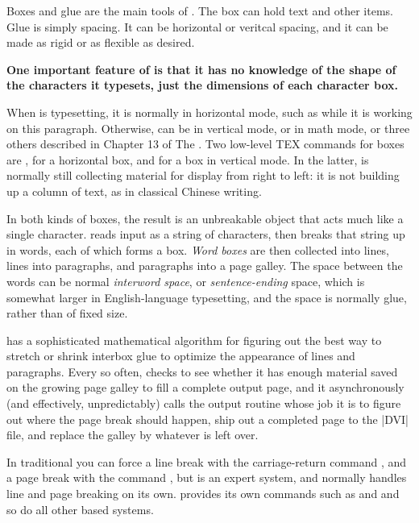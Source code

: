 Boxes and glue are the main tools of \tex. The box can hold text and other items. Glue is simply spacing. It can be horizontal or veritcal spacing, and it can be made as rigid or as flexible as desired.



\begin{minipage}{\linewidth}
\textbf{One important feature of \tex is that it has no knowledge of the shape of the characters it typesets, just the dimensions of each character box.}
\end{minipage}
\medskip

When \tex is typesetting, it is normally in horizontal mode, such as while
it is working on this paragraph. Otherwise, \tex can be in vertical mode, or
in math mode, or three others described in Chapter 13 of The \texbook.
Two low-level TEX commands for boxes are , for a horizontal box,
and  for a box in vertical mode. In the latter, \tex is normally still
collecting material for display from right to left: it is not building up a
column of text, as in classical Chinese writing.

In both kinds of boxes, the result is an unbreakable object that acts
much like a single character. \tex reads input as a string of characters,
then breaks that string up in words, each of which forms a box. 
\emph{Word boxes}
are then collected into lines, lines into paragraphs, and paragraphs into a
page galley. The space between the words can be normal \emph{interword space},
or \emph{sentence-ending} space, which is somewhat larger in English-language
typesetting, and the space is normally glue, rather than of fixed size.

\tex has a sophisticated mathematical algorithm for figuring out the
best way to stretch or shrink interbox glue to optimize the appearance of
lines and paragraphs. Every so often, \tex checks to see whether it has
enough material saved on the growing page galley to fill a complete output
page, and it asynchronously (and effectively, unpredictably) calls the
output routine whose job it is to figure out where the page break should
happen, ship out a completed page to the |DVI|  file, and replace the galley by
whatever is left over.

In traditional \tex you  can force a line break with the carriage-return command ,
and a page break with the command , but \tex is an expert system,
and normally handles line and page breaking on its own. \latex provides its own commands such as  and  and so do all other \tex based systems.


